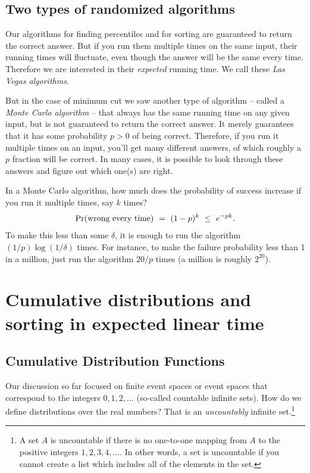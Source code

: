 \subsection{Two types of randomized algorithms}

Our algorithms for finding percentiles and for sorting are guaranteed to return 
the correct answer. But if you run them multiple times on the same input, their 
running times will fluctuate, even though the answer will be the same every time. 
Therefore we are interested in their {\it expected} running time. We call these 
{\it Las Vegas algorithms}.

But in the case of minimum cut we saw another type of algorithm -- called a 
{\it Monte Carlo algorithm} -- that always has the same running time on any 
given input, but is not guaranteed to return the correct answer. It merely 
guarantees that it has some probability $p > 0$ of being correct. Therefore, if 
you run it multiple times on an input, you'll get many different answers, of 
which roughly a $p$ fraction will be correct. In many cases, it is possible to
look through these answers and figure out which one(s) are right.

In a Monte Carlo algorithm, how much does the probability of success increase if you
run it multiple times, say $k$ times?
$$ \pr(\mbox{wrong every time}) \ = \ (1-p)^k \ \leq \ e^{-pk} .$$
To make this less than some $\delta$, it is enough to run the algorithm 
$(1/p) \log (1/\delta)$ times. For instance, to make the failure probability less than 
1 in a million, just run the algorithm $20/p$ times (a million is roughly $2^{20}$).

\section{Cumulative distributions and sorting in expected linear time}

\subsection{Cumulative Distribution Functions}

Our discussion so far focused on finite event spaces or event spaces
that correspond to the integers $0,1,2,\ldots$ (so-called countable
infinite sets). How do we define distributions over the real numbers?
That is an {\em uncountably} infinite set.\footnote{A set $A$ is
  uncountable if there is no one-to-one mapping from $A$ to the
  positive integers $1,2,3,4,...$. In other words, a set is
  uncountable if you cannot create a list which includes all of the
  elements in the set.}

